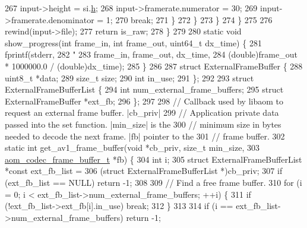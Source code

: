 \begin{DoxyCodeInclude}
{{{{{{{267           input->height = si.\hyperlink{structaom__codec__stream__info_a2f1c33e3b980b274176545340b474e34}{h};
268           input->framerate.numerator = 30;
269           input->framerate.denominator = 1;
270           \textcolor{keywordflow}{break};
271         \}
272       \}
273     \}
274   \}
275 
276   rewind(input->file);
277   \textcolor{keywordflow}{return} is\_raw;
278 \}
279 
280 \textcolor{keyword}{static} \textcolor{keywordtype}{void} show\_progress(\textcolor{keywordtype}{int} frame\_in, \textcolor{keywordtype}{int} frame\_out, uint64\_t dx\_time) \{
281   fprintf(stderr,
282           \textcolor{stringliteral}{"%
283           frame\_in, frame\_out, dx\_time,
284           (\textcolor{keywordtype}{double})frame\_out * 1000000.0 / (\textcolor{keywordtype}{double})dx\_time);
285 \}
286 
287 \textcolor{keyword}{struct }ExternalFrameBuffer \{
288   uint8\_t *data;
289   \textcolor{keywordtype}{size\_t} size;
290   \textcolor{keywordtype}{int} in\_use;
291 \};
292 
293 \textcolor{keyword}{struct }ExternalFrameBufferList \{
294   \textcolor{keywordtype}{int} num\_external\_frame\_buffers;
295   \textcolor{keyword}{struct }ExternalFrameBuffer *ext\_fb;
296 \};
297 
298 \textcolor{comment}{// Callback used by libaom to request an external frame buffer. |cb\_priv|}
299 \textcolor{comment}{// Application private data passed into the set function. |min\_size| is the}
300 \textcolor{comment}{// minimum size in bytes needed to decode the next frame. |fb| pointer to the}
301 \textcolor{comment}{// frame buffer.}
302 \textcolor{keyword}{static} \textcolor{keywordtype}{int} get\_av1\_frame\_buffer(\textcolor{keywordtype}{void} *cb\_priv, \textcolor{keywordtype}{size\_t} min\_size,
303                                 \hyperlink{structaom__codec__frame__buffer}{aom\_codec\_frame\_buffer\_t} *fb) \{
304   \textcolor{keywordtype}{int} i;
305   \textcolor{keyword}{struct }ExternalFrameBufferList *\textcolor{keyword}{const} ext\_fb\_list =
306       (\textcolor{keyword}{struct }ExternalFrameBufferList *)cb\_priv;
307   \textcolor{keywordflow}{if} (ext\_fb\_list == NULL) \textcolor{keywordflow}{return} -1;
308 
309   \textcolor{comment}{// Find a free frame buffer.}
310   \textcolor{keywordflow}{for} (i = 0; i < ext\_fb\_list->num\_external\_frame\_buffers; ++i) \{
311     \textcolor{keywordflow}{if} (!ext\_fb\_list->ext\_fb[i].in\_use) \textcolor{keywordflow}{break};
312   \}
313 
314   \textcolor{keywordflow}{if} (i == ext\_fb\_list->num\_external\_frame\_buffers) \textcolor{keywordflow}{return} -1;
}}}}}}}}
\end{DoxyCodeInclude}
